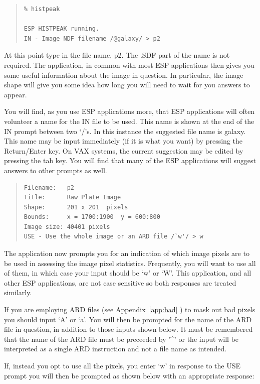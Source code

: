 \documentclass[twoside,11pt]{article}
\newenvironment{myquote}{\begin{quote}\begin{small}}{\end{small}\end{quote}}
\begin{document}
\begin{myquote}
\begin{verbatim}
% histpeak

ESP HISTPEAK running.
IN - Image NDF filename /@galaxy/ > p2
\end{verbatim}
\end{myquote}

At this point type in the file name, p2. The .SDF part of the name is 
not required. The application, in common with most ESP applications
then gives you some useful information about the image in question.
In particular, the image shape will give you some idea how long you will 
need to wait for you answers to appear. 

You will find, as you use ESP applications more, that ESP applications will
often volunteer a name for the IN file to be used. This name is shown at the 
end of the IN  prompt between two `/'s. In this instance the suggested file
name is galaxy. This name may be input
immediately (if it is what you want) by pressing the Return/Enter
key. On VAX systems, the current suggestion may be edited by pressing the tab
key. You will find that many of the ESP applications will suggest answers to
other prompts as well. 

\begin{myquote}
\begin{verbatim}
Filename:   p2
Title:      Raw Plate Image
Shape:      201 x 201  pixels
Bounds:     x = 1700:1900  y = 600:800
Image size: 40401 pixels
USE - Use the whole image or an ARD file /`w'/ > w
\end{verbatim}
\end{myquote}

The application now prompts you for an indication of which image pixels are
to be used in assessing the image pixel statistics. Frequently, you 
will want to use all of
them, in which case your input should be `w' or `W'. This application,
and all other ESP applications, 
are not case sensitive so both responses are treated similarly.

If you are employing ARD files (see Appendix~\ref{app:bad} ) to mask out bad 
pixels you should input `A' or `a'.
You will then be
prompted for the name of the ARD file in question, in addition to those 
inputs shown below. It must be remembered that the name of the ARD file 
must be preceeded by '\^{ }' or the input will be interpreted as a single 
ARD instruction and 
not a file name as intended.

If, instead you opt to use all the pixels, you enter `w' in response to the 
USE prompt you will then be prompted as shown below with an appropriate 
response:
\end{document}
